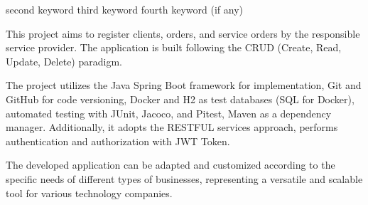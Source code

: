 {second keyword}
{third keyword}
{fourth keyword (if any)}




This project aims to register clients, orders, and service orders by the responsible service provider. The application is built following the CRUD (Create, Read, Update, Delete) paradigm.

The project utilizes the Java Spring Boot framework for implementation, Git and GitHub for code versioning, Docker and H2 as test databases (SQL for Docker), automated testing with JUnit, Jacoco, and Pitest, Maven as a dependency manager. Additionally, it adopts the RESTFUL services approach, performs authentication and authorization with JWT Token.

The developed application can be adapted and customized according to the specific needs of different types of businesses, representing a versatile and scalable tool for various technology companies.\\

\printkeys %


